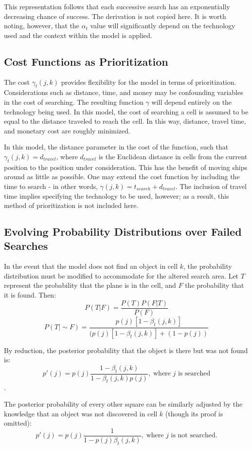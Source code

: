\documentclass[a4paper]{article}
\begin{document}
This representation follows that each successive search has an exponentially decreasing chance of success. The derivation is not copied here. It is worth noting, however, that the $\alpha_t$ value will significantly depend on the technology used and the context within the model is applied.

\subsection{Cost Functions as Prioritization}

The cost $\gamma_t(j,k)$ provides flexibility for the model in terms of prioritization. Considerations such as distance, time, and money may be confounding variables in the cost of searching. The resulting function $\gamma$ will depend entirely on the technology being used. In this model, the cost of searching a cell is assumed to be equal to the distance traveled to reach the cell. In this way, distance, travel time, and monetary cost are roughly minimized.

In this model, the distance parameter in the cost of the function, such that $\gamma_t(j,k)=d_{travel}$, where $d_{travel}$ is the Euclidean distance in cells from the current position to the position under consideration. This has the benefit of moving ships around as little as possible. One may extend the cost function by including the time to search - in other words, $\gamma(j,k)=t_{search}+d_{travel}$. The inclusion of travel time implies specifying the technology to be used, however; as a result, this method of prioritization is not included here.  

\subsection{Evolving Probability Distributions over Failed Searches}

In the event that the model does not find an object in cell $k$, the probability distribution must be modified to accommodate for the altered search area. Let $T$ represent the probability that the plane is in the cell, and $F$ the probability that it is found. Then: 
$$P(T|F)=\frac{P(T)P(F|T)}{P(F)}$$ 
$$P(T|\sim F)=\frac{p(j)[1-\beta_t(j,k)]}{(p(j)[1-\beta_t(j,k)]+(1-p(j))}$$

By reduction, the posterior probability that the object is there but was not found is: $$p'(j)=p(j)\frac{1-\beta_t(j,k)}{1-\beta_t(j,k)p(j)},\;\mbox{where }j\mbox{ is searched}$$.

The posterior probability of every other square can be similarly adjusted by the knowledge that an object was not discovered in cell $k$ (though its proof is omitted): $$p'(j)=p(j)\frac{1}{1-p(j)\beta_t(j,k)},\;\mbox{where }j\mbox{ is not searched.}$$
\end{document}
